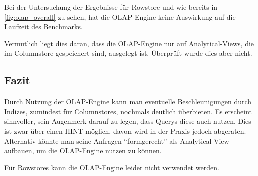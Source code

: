Bei der Untersuchung der Ergebnisse für Rowstore und wie bereits in \autoref{fig:olap_overall} zu sehen, hat die OLAP-Engine keine Auswirkung auf die Laufzeit des Benchmarks.

Vermutlich liegt dies daran, dass die OLAP-Engine nur auf Analytical-Views, die im Columnstore gespeichert sind, ausgelegt ist. Überprüft wurde dies aber nicht.



\subsection{Fazit}
Durch Nutzung der OLAP-Engine kann man eventuelle Beschleunigungen durch Indizes, zumindest für Columnstores, nochmals deutlich überbieten.
Es erscheint sinnvoller, sein Augenmerk darauf zu legen, dass Querys diese auch nutzen. Dies ist zwar über einen HINT möglich, davon wird in der Praxis jedoch abgeraten.
Alternativ könnte man seine Anfragen \enquote{formgerecht} als Analytical-View aufbauen, um die OLAP-Engine nutzen zu können.

Für Rowstores kann die OLAP-Engine leider nicht verwendet werden.

